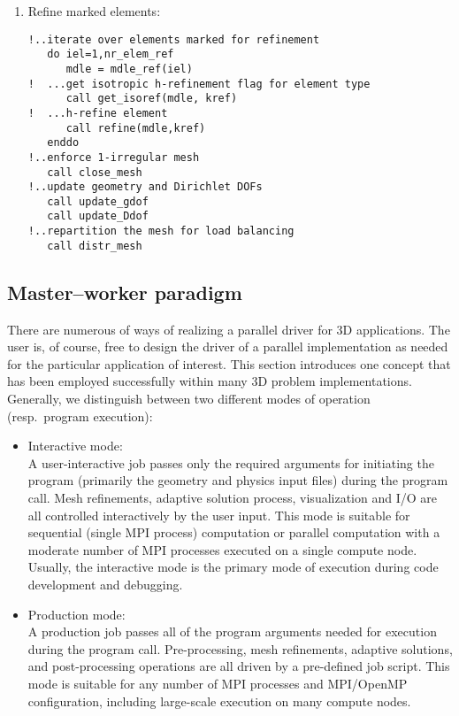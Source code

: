 \begin{enumerate}
\begin{lstlisting}[caption=Adaptive refinements based on element residuals: (c) element marking., label={lst:adaptive_refinement_element_loop3}]
   \end{lstlisting}
\item
	Refine marked elements:
	\begin{lstlisting}[caption=Adaptive refinements based on element residuals: (d) element refinement., label={lst:adaptive_refinement_element_loop4}]
!..iterate over elements marked for refinement
   do iel=1,nr_elem_ref
      mdle = mdle_ref(iel)
!  ...get isotropic h-refinement flag for element type
      call get_isoref(mdle, kref)
!  ...h-refine element
      call refine(mdle,kref)
   enddo
!..enforce 1-irregular mesh
   call close_mesh
!..update geometry and Dirichlet DOFs
   call update_gdof
   call update_Ddof
!..repartition the mesh for load balancing
   call distr_mesh
	\end{lstlisting}
\end{enumerate}

\FloatBarrier
\subsection{Master--worker paradigm}
\label{sec:master-worker-paradigm}

There are numerous of ways of realizing a parallel driver for \hp3D applications. The user is, of course, free to design the driver of a parallel implementation as needed for the particular application of interest. This section introduces one concept that has been employed successfully within many \hp3D problem implementations. Generally, we distinguish between two different modes of operation (resp.\ program execution):

\begin{itemize}
	\item Interactive mode: \\
	A user-interactive job passes only the required arguments for initiating the program (primarily the geometry and physics input files) during the program call. Mesh refinements, adaptive solution process, visualization and I/O are all controlled interactively by the user input. This mode is suitable for sequential (single MPI process) computation or parallel computation with a moderate number of MPI processes executed on a single compute node. Usually, the interactive mode is the primary mode of execution during code development and debugging.
	\item Production mode: \\
	A production job passes all of the program arguments needed for execution during the program call. Pre-processing, mesh refinements, adaptive solutions, and post-processing operations are all driven by a pre-defined job script. This mode is suitable for any number of MPI processes and MPI/OpenMP configuration, including large-scale execution on many compute nodes.
\end{itemize}

